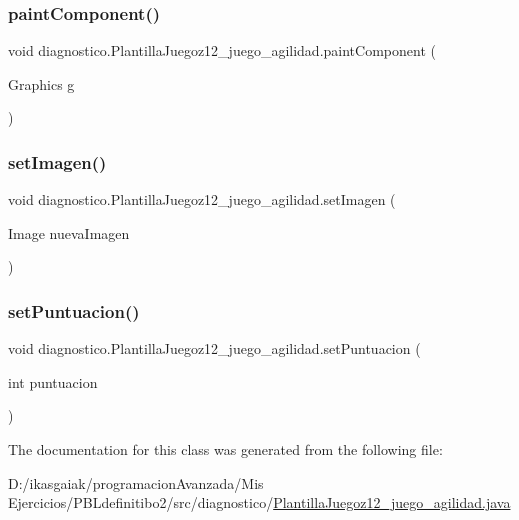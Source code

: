 \subsubsection{\texorpdfstring{paint\+Component()}{paintComponent()}}
{\footnotesize\ttfamily void diagnostico.\+Plantilla\+Juegoz12\+\_\+juego\+\_\+agilidad.\+paint\+Component (\begin{DoxyParamCaption}\item[{Graphics}]{g }\end{DoxyParamCaption})\hspace{0.3cm}{\ttfamily [protected]}}

\mbox{\label{classdiagnostico_1_1_plantilla_juegoz12__juego__agilidad_a0cacf194953b7902dd48aa93e9c3a11c}} 
\subsubsection{\texorpdfstring{set\+Imagen()}{setImagen()}}
{\footnotesize\ttfamily void diagnostico.\+Plantilla\+Juegoz12\+\_\+juego\+\_\+agilidad.\+set\+Imagen (\begin{DoxyParamCaption}\item[{Image}]{nueva\+Imagen }\end{DoxyParamCaption})}

\mbox{\label{classdiagnostico_1_1_plantilla_juegoz12__juego__agilidad_ad512eb78e5944725f2b51903d423ef7e}} 
\subsubsection{\texorpdfstring{set\+Puntuacion()}{setPuntuacion()}}
{\footnotesize\ttfamily void diagnostico.\+Plantilla\+Juegoz12\+\_\+juego\+\_\+agilidad.\+set\+Puntuacion (\begin{DoxyParamCaption}\item[{int}]{puntuacion }\end{DoxyParamCaption})}



The documentation for this class was generated from the following file\+:\begin{DoxyCompactItemize}
\item 
D\+:/ikasgaiak/programacion\+Avanzada/\+Mis Ejercicios/\+P\+B\+Ldefinitibo2/src/diagnostico/\mbox{\hyperlink{_plantilla_juegoz12__juego__agilidad_8java}{Plantilla\+Juegoz12\+\_\+juego\+\_\+agilidad.\+java}}\end{DoxyCompactItemize}
